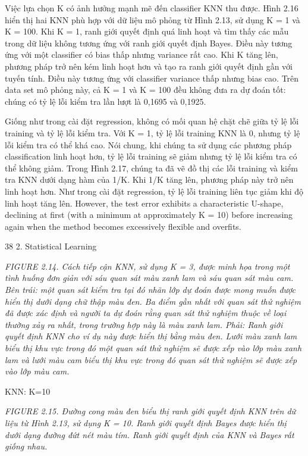 Việc lựa chọn K có ảnh hưởng mạnh mẽ đến classifier KNN thu được. Hình 2.16 hiển thị hai KNN phù hợp với dữ liệu mô phỏng từ Hình 2.13, sử dụng K = 1 và K = 100. Khi K = 1, ranh giới quyết định quá linh hoạt và tìm thấy các mẫu trong dữ liệu không tương ứng với ranh giới quyết định Bayes. Điều này tương ứng với một classifier có bias thấp nhưng variance rất cao. Khi K tăng lên, phương pháp trở nên kém linh hoạt hơn và tạo ra ranh giới quyết định gần với tuyến tính. Điều này tương ứng với classifier variance thấp nhưng bias cao. Trên data set mô phỏng này, cả K = 1 và K = 100 đều không đưa ra dự đoán tốt: chúng có tỷ lệ lỗi kiểm tra lần lượt là 0,1695 và 0,1925.

Giống như trong cài đặt regression, không có mối quan hệ chặt chẽ giữa tỷ lệ lỗi training và tỷ lệ lỗi kiểm tra. Với K = 1, tỷ lệ lỗi training KNN là 0, nhưng tỷ lệ lỗi kiểm tra có thể khá cao. Nói chung, khi chúng ta sử dụng các phương pháp classification linh hoạt hơn, tỷ lệ lỗi training sẽ giảm nhưng tỷ lệ lỗi kiểm tra có thể không giảm. Trong Hình 2.17, chúng ta đã vẽ đồ thị các lỗi training và kiểm tra KNN dưới dạng hàm của 1/K. Khi 1/K tăng lên, phương pháp này trở nên linh hoạt hơn. Như trong cài đặt regression, tỷ lệ lỗi training liên tục giảm khi độ linh hoạt tăng lên. However, the test error exhibits a characteristic U-shape, declining at first (with a minimum at approximately K = 10) before increasing again when the method becomes excessively flexible and overfits.

38 2. Statistical Learning

\noindent\textit{FIGURE 2.14. Cách tiếp cận KNN, sử dụng K = 3, được minh họa trong một tình huống đơn giản với sáu quan sát màu xanh lam và sáu quan sát màu cam. Bên trái: một quan sát kiểm tra tại đó nhãn lớp dự đoán được mong muốn được hiển thị dưới dạng chữ thập màu đen. Ba điểm gần nhất với quan sát thử nghiệm đã được xác định và người ta dự đoán rằng quan sát thử nghiệm thuộc về loại thường xảy ra nhất, trong trường hợp này là màu xanh lam. Phải: Ranh giới quyết định KNN cho ví dụ này được hiển thị bằng màu đen. Lưới màu xanh lam biểu thị khu vực trong đó một quan sát thử nghiệm sẽ được xếp vào lớp màu xanh lam và lưới màu cam biểu thị khu vực trong đó quan sát thử nghiệm sẽ được xếp vào lớp màu cam.}

KNN: K=10

\noindent\textit{FIGURE 2.15. Đường cong màu đen biểu thị ranh giới quyết định KNN trên dữ liệu từ Hình 2.13, sử dụng K = 10. Ranh giới quyết định Bayes được hiển thị dưới dạng đường đứt nét màu tím. Ranh giới quyết định của KNN và Bayes rất giống nhau.}

